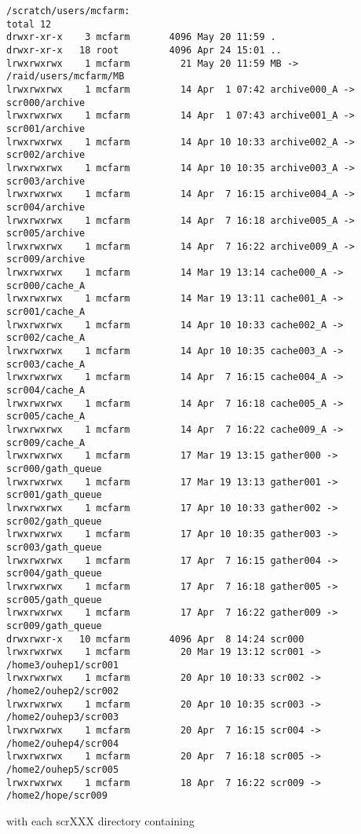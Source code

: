 \documentclass{revtex4}
\begin{document}
\begin{verbatim}
/scratch/users/mcfarm:
total 12
drwxr-xr-x    3 mcfarm       4096 May 20 11:59 .
drwxr-xr-x   18 root         4096 Apr 24 15:01 ..
lrwxrwxrwx    1 mcfarm         21 May 20 11:59 MB -> /raid/users/mcfarm/MB
lrwxrwxrwx    1 mcfarm         14 Apr  1 07:42 archive000_A -> scr000/archive
lrwxrwxrwx    1 mcfarm         14 Apr  1 07:43 archive001_A -> scr001/archive
lrwxrwxrwx    1 mcfarm         14 Apr 10 10:33 archive002_A -> scr002/archive
lrwxrwxrwx    1 mcfarm         14 Apr 10 10:35 archive003_A -> scr003/archive
lrwxrwxrwx    1 mcfarm         14 Apr  7 16:15 archive004_A -> scr004/archive
lrwxrwxrwx    1 mcfarm         14 Apr  7 16:18 archive005_A -> scr005/archive
lrwxrwxrwx    1 mcfarm         14 Apr  7 16:22 archive009_A -> scr009/archive
lrwxrwxrwx    1 mcfarm         14 Mar 19 13:14 cache000_A -> scr000/cache_A
lrwxrwxrwx    1 mcfarm         14 Mar 19 13:11 cache001_A -> scr001/cache_A
lrwxrwxrwx    1 mcfarm         14 Apr 10 10:33 cache002_A -> scr002/cache_A
lrwxrwxrwx    1 mcfarm         14 Apr 10 10:35 cache003_A -> scr003/cache_A
lrwxrwxrwx    1 mcfarm         14 Apr  7 16:15 cache004_A -> scr004/cache_A
lrwxrwxrwx    1 mcfarm         14 Apr  7 16:18 cache005_A -> scr005/cache_A
lrwxrwxrwx    1 mcfarm         14 Apr  7 16:22 cache009_A -> scr009/cache_A
lrwxrwxrwx    1 mcfarm         17 Mar 19 13:15 gather000 -> scr000/gath_queue
lrwxrwxrwx    1 mcfarm         17 Mar 19 13:13 gather001 -> scr001/gath_queue
lrwxrwxrwx    1 mcfarm         17 Apr 10 10:33 gather002 -> scr002/gath_queue
lrwxrwxrwx    1 mcfarm         17 Apr 10 10:35 gather003 -> scr003/gath_queue
lrwxrwxrwx    1 mcfarm         17 Apr  7 16:15 gather004 -> scr004/gath_queue
lrwxrwxrwx    1 mcfarm         17 Apr  7 16:18 gather005 -> scr005/gath_queue
lrwxrwxrwx    1 mcfarm         17 Apr  7 16:22 gather009 -> scr009/gath_queue
drwxrwxr-x   10 mcfarm       4096 Apr  8 14:24 scr000
lrwxrwxrwx    1 mcfarm         20 Mar 19 13:12 scr001 -> /home3/ouhep1/scr001
lrwxrwxrwx    1 mcfarm         20 Apr 10 10:33 scr002 -> /home2/ouhep2/scr002
lrwxrwxrwx    1 mcfarm         20 Apr 10 10:35 scr003 -> /home2/ouhep3/scr003
lrwxrwxrwx    1 mcfarm         20 Apr  7 16:15 scr004 -> /home2/ouhep4/scr004
lrwxrwxrwx    1 mcfarm         20 Apr  7 16:18 scr005 -> /home2/ouhep5/scr005
lrwxrwxrwx    1 mcfarm         18 Apr  7 16:22 scr009 -> /home2/hope/scr009
\end{verbatim}

\newpage

with each scrXXX directory containing
\end{document}
